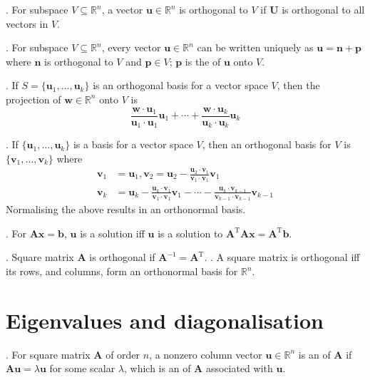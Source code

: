 \documentclass{slnotes}
\newcommand*{\TT}{\mathrm{T}}
\begin{document}
. For subspace \(V \subseteq \mathbb{R}^n\), a vector \(\mathbf{u} \in \mathbb{R}^n\) is orthogonal to \(V\) if \(\mathbf{U}\) is orthogonal to all vectors in \(V\).

. For subspace \(V \subseteq \mathbb{R}^n\), every vector \(\mathbf{u} \in \mathbb{R}^n\) can be written uniquely as \(\mathbf{u} = \mathbf{n} + \mathbf{p}\) where \(\mathbf{n}\) is orthogonal to \(V\) and \(\mathbf{p} \in V\); \(\mathbf{p}\) is the  of \(\mathbf{u}\) onto \(V\).

. If \(S = \{\mathbf{u}_1, \hdots, \mathbf{u}_k\}\) is an orthogonal basis for a vector space \(V\), then the projection of \(\mathbf{w} \in \mathbb{R}^n\) onto \(V\) is \[\frac{\mathbf{w}\cdot\mathbf{u}_1}{\mathbf{u}_1\cdot\mathbf{u}_1}\mathbf{u}_1 + \cdots + \frac{\mathbf{w}\cdot\mathbf{u}_k}{\mathbf{u}_k\cdot\mathbf{u}_k}\mathbf{u}_k\]

. If \(\{\mathbf{u}_1, \hdots, \mathbf{u}_k\}\) is a basis for a vector space \(V\), then an orthogonal basis for \(V\) is \(\{\mathbf{v}_1, \hdots, \mathbf{v}_k\}\) where \begin{align*}
\mathbf{v}_1 &= \mathbf{u}_1, \mathbf{v}_2 = \mathbf{u}_2 - \frac{\mathbf{u}_2 \cdot \mathbf{v}_1}{\mathbf{v}_1 \cdot \mathbf{v}_1}\mathbf{v}_1\\
\mathbf{v}_k &= \mathbf{u}_k - \frac{\mathbf{u}_k \cdot \mathbf{v}_1}{\mathbf{v}_1 \cdot \mathbf{v}_1}\mathbf{v}_1 - \cdots - \frac{\mathbf{u}_k \cdot \mathbf{v}_{k-1}}{\mathbf{v}_{k-1} \cdot \mathbf{v}_{k-1}}\mathbf{v}_{k-1}
\end{align*}
Normalising the above results in an orthonormal basis.

. For \(\mathbf{Ax} = \mathbf{b}\), \(\mathbf{u}\) is a  solution iff \(\mathbf{u}\) is a solution to \(\mathbf{A}^\TT\mathbf{Ax} = \mathbf{A}^\TT\mathbf{b}\).

. Square matrix \(\mathbf A\) is orthogonal if \(\mathbf{A}^{-1} = \mathbf{A}^\TT\). . A square matrix is orthogonal iff its rows, and columns, form an orthonormal basis for \(\mathbb R^n\).

\chapter{Eigenvalues and diagonalisation}
. For square matrix \(\mathbf A\) of order \(n\), a nonzero column vector \(\mathbf u \in \mathbb{R}^n\) is an  of \(\mathbf A\) if \(\mathbf{Au} = \lambda\mathbf{u}\) for some scalar \(\lambda\), which is an  of \(\mathbf A\) associated with \(\mathbf u\).
\end{document}
